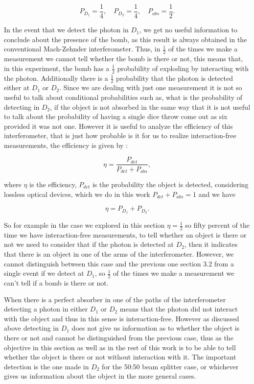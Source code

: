 \documentclass{book}
\begin{document}
\begin{equation}
P_{D_{1}}=\frac{1}{4},\quad P_{D_{2}}=\frac{1}{4}, \quad P_{abs}=\frac{1}{2}.
\end{equation}



In the event that we detect the photon in $D_{1}$, we get no useful information to conclude about the presence of the bomb, as this result is always obtained in the conventional Mach-Zehnder interferometer. Thus, in $\frac{1}{2}$ of the times we make a measurement we cannot tell whether the bomb is there or not, this means that, in this experiment, the bomb has a $\frac{1}{2}$ probability of exploding by interacting with the photon. Additionally there is a $\frac{1}{2}$ probability that the photon is detected either at $D_{1}$ or $D_{2}$. Since we are dealing with just one measurement it is not so useful to talk about conditional probabilities such as, what is the probability of detecting in $D_{2}$, if the object is not absorbed in the same way that it is not useful to talk about the probability of having a single dice throw come out as six provided it was not one. However it is useful to analyze the efficiency of this interferometer, that is just how probable is it for us to realize interaction-free measurements, the efficiency is given by \cite{5}:

\begin{equation}
\eta=\frac{P_{det}}{P_{det}+P_{abs}},
\end{equation}

where $\eta$ is the efficiency, $P_{det}$ is the probability the object is detected, considering lossless optical devices, which we do in this work $P_{det}+P_{abs}=1$ and we have

\begin{equation}
\eta=P_{D_{1}}+P_{D_{2}}.
\end{equation}

So for example in the case we explored in this section $\eta=\frac{1}{2}$ so fifty percent of the time we have interaction-free measurements, to tell whether an object is there or not we need to consider that if the photon is detected at $D_{2}$, then it indicates that there is an object in one of the arms of the interferometer. However, we cannot distinguish between this case and the previous one section 3.2 from a single event if we detect at $D_{1}$, so $\frac{1}{2}$ of the times we make a measurement we can't tell if a bomb is there or not.

When there is a perfect absorber in one of the paths of the interferometer detecting a photon in either $D_{1}$ or $D_{2}$ means that the photon did not interact with the object and thus in this sense is interaction-free. However as discussed above detecting in $D_{1}$ does not give us information as to whether the object is there or not and cannot be distinguished from the previous case, thus as the objective in this section as well as in the rest of this work is to be able to tell whether the object is there or not without interaction with it. The important detection is the one made in $D_{2}$ for the 50:50 beam splitter case, or whichever gives us information about the object in the more general cases.
  
\end{document}

